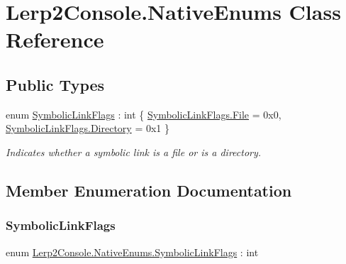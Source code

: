 \hypertarget{class_lerp2_console_1_1_native_enums}{}\section{Lerp2\+Console.\+Native\+Enums Class Reference}
\label{class_lerp2_console_1_1_native_enums}
\subsection*{Public Types}
\begin{DoxyCompactItemize}
\item 
enum \hyperlink{class_lerp2_console_1_1_native_enums_a4eb3b3db1c6666b1e520bd67a14d9727}{Symbolic\+Link\+Flags} \+: int \{ \hyperlink{class_lerp2_console_1_1_native_enums_a4eb3b3db1c6666b1e520bd67a14d9727a0b27918290ff5323bea1e3b78a9cf04e}{Symbolic\+Link\+Flags.\+File} = 0x0, 
\hyperlink{class_lerp2_console_1_1_native_enums_a4eb3b3db1c6666b1e520bd67a14d9727ae73cda510e8bb947f7e61089e5581494}{Symbolic\+Link\+Flags.\+Directory} = 0x1
 \}\begin{DoxyCompactList}\small\item\em Indicates whether a symbolic link is a file or is a directory. \end{DoxyCompactList}
\end{DoxyCompactItemize}


\subsection{Member Enumeration Documentation}
\mbox{\label{class_lerp2_console_1_1_native_enums_a4eb3b3db1c6666b1e520bd67a14d9727}} 
\subsubsection{\texorpdfstring{Symbolic\+Link\+Flags}{SymbolicLinkFlags}}
{\footnotesize\ttfamily enum \hyperlink{class_lerp2_console_1_1_native_enums_a4eb3b3db1c6666b1e520bd67a14d9727}{Lerp2\+Console.\+Native\+Enums.\+Symbolic\+Link\+Flags} \+: int\hspace{0.3cm}{\ttfamily [strong]}}



